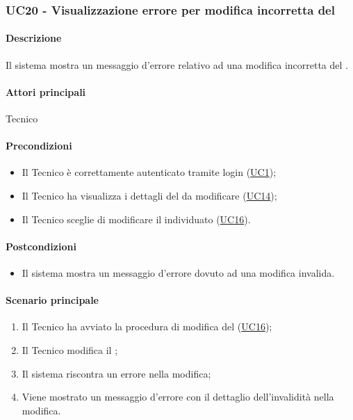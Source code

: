 \subsubsection{UC20 - Visualizzazione errore per modifica incorretta del }\label{UC20}
\paragraph*{Descrizione}
Il sistema mostra un messaggio d’errore relativo ad una modifica incorretta del .

\paragraph*{Attori principali}
Tecnico

\paragraph*{Precondizioni}
\begin{itemize}
  \item Il Tecnico è correttamente autenticato tramite login (\hyperref[UC1]{UC1});
  \item Il Tecnico ha visualizza i dettagli del  da modificare (\hyperref[UC14]{UC14});
  \item Il Tecnico sceglie di modificare il  individuato (\hyperref[UC16]{UC16}).
\end{itemize}

\paragraph*{Postcondizioni}
\begin{itemize}
  \item Il sistema mostra un messaggio d’errore dovuto ad una modifica invalida.
\end{itemize}

\paragraph*{Scenario principale}
\begin{enumerate}
  \item Il Tecnico ha avviato la procedura di modifica del  (\hyperref[UC16]{UC16});
  \item Il Tecnico modifica il ;
  \item Il sistema riscontra un errore nella modifica;
  \item Viene mostrato un messaggio d'errore con il dettaglio dell'invalidità nella modifica.  
\end{enumerate}

